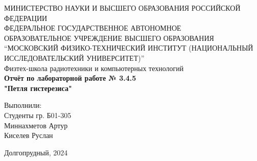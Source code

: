\begin{center}
МИНИСТЕРСТВО НАУКИ И ВЫСШЕГО ОБРАЗОВАНИЯ РОССИЙСКОЙ ФЕДЕРАЦИИ\\
\hfill \break
ФЕДЕРАЛЬНОЕ ГОСУДАРСТВЕННОЕ АВТОНОМНОЕ \\ ОБРАЗОВАТЕЛЬНОЕ УЧРЕЖДЕНИЕ ВЫСШЕГО ОБРАЗОВАНИЯ \\
“МОСКОВСКИЙ ФИЗИКО-ТЕХНИЧЕСКИЙ ИНСТИТУТ (НАЦИОНАЛЬНЫЙ ИССЛЕДОВАТЕЛЬСКИЙ УНИВЕРСИТЕТ)” \\

\hfill \break
Физтех-школа радиотехники и компьютерных технологий\\
\vspace{2.5cm}
\large{\textbf{Отчёт по лабораторной работе № 3.4.5}}\\
\large{\textbf{"Петля гистерезиса"}}\\
\hfill \break
\end{center}

\vspace{5cm}

\begin{flushright}
Выполнили:\\
Студенты гр. Б01-305\\
Миннахметов Артур\\
Киселев Руслан\\
\end{flushright}

\vfill


\begin{center} Долгопрудный, 2024 \end{center}

\thispagestyle{empty}
\newpage
